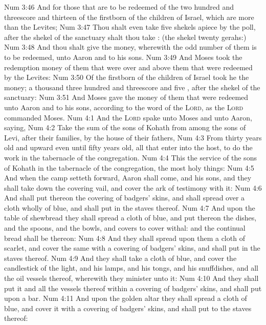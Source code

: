 \vs Num 3:46 And for those that are to be redeemed of the two hundred and threescore and thirteen of the firstborn of the children of Israel, which are more than the Levites;
\vs Num 3:47 Thou shalt even take five shekels apiece by the poll, after the shekel of the sanctuary shalt thou take : (the shekel  twenty gerahs:)
\vs Num 3:48 And thou shalt give the money, wherewith the odd number of them is to be redeemed, unto Aaron and to his sons.
\vs Num 3:49 And Moses took the redemption money of them that were over and above them that were redeemed by the Levites:
\vs Num 3:50 Of the firstborn of the children of Israel took he the money; a thousand three hundred and threescore and five , after the shekel of the sanctuary:
\vs Num 3:51 And Moses gave the money of them that were redeemed unto Aaron and to his sons, according to the word of the \textsc{Lord}, as the \textsc{Lord} commanded Moses.
\vs Num 4:1 And the \textsc{Lord} spake unto Moses and unto Aaron, saying,
\vs Num 4:2 Take the sum of the sons of Kohath from among the sons of Levi, after their families, by the house of their fathers,
\vs Num 4:3 From thirty years old and upward even until fifty years old, all that enter into the host, to do the work in the tabernacle of the congregation.
\vs Num 4:4 This  the service of the sons of Kohath in the tabernacle of the congregation,  the most holy things:
\vs Num 4:5 And when the camp setteth forward, Aaron shall come, and his sons, and they shall take down the covering vail, and cover the ark of testimony with it:
\vs Num 4:6 And shall put thereon the covering of badgers' skins, and shall spread over  a cloth wholly of blue, and shall put in the staves thereof.
\vs Num 4:7 And upon the table of shewbread they shall spread a cloth of blue, and put thereon the dishes, and the spoons, and the bowls, and covers to cover withal: and the continual bread shall be thereon:
\vs Num 4:8 And they shall spread upon them a cloth of scarlet, and cover the same with a covering of badgers' skins, and shall put in the staves thereof.
\vs Num 4:9 And they shall take a cloth of blue, and cover the candlestick of the light, and his lamps, and his tongs, and his snuffdishes, and all the oil vessels thereof, wherewith they minister unto it:
\vs Num 4:10 And they shall put it and all the vessels thereof within a covering of badgers' skins, and shall put  upon a bar.
\vs Num 4:11 And upon the golden altar they shall spread a cloth of blue, and cover it with a covering of badgers' skins, and shall put to the staves thereof:
